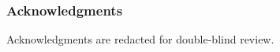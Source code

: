 \documentclass{article}
\begin{document}
\subsubsection*{Acknowledgments}
Acknowledgments are redacted for double-blind review.

\clearpage



\clearpage

\end{document}
